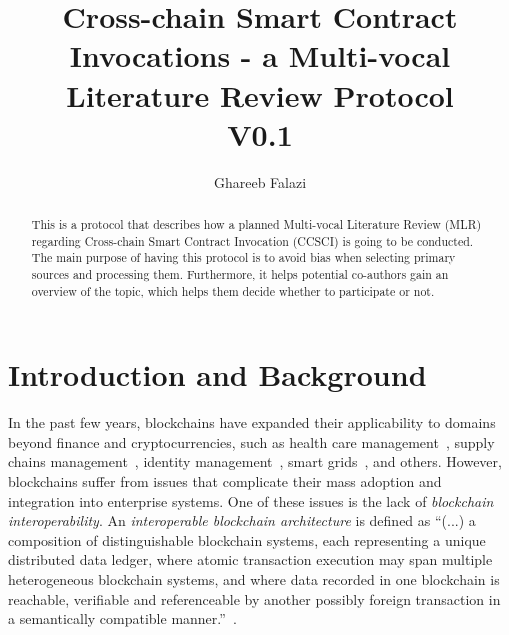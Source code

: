 \documentclass[review]{elsarticle}
\begin{document}
\begin{frontmatter}

\title{Cross-chain Smart Contract Invocations - a Multi-vocal Literature Review Protocol\\V0.1}
\author[iaas]{Ghareeb Falazi}
\address[iaas]{Universit\"atsstra\ss{}e 38, 70569 Stuttgart}


\begin{abstract}
This is a protocol that describes how a planned Multi-vocal Literature Review (MLR) regarding Cross-chain Smart Contract Invocation (CCSCI) is going to be conducted.
The main purpose of having this protocol is to avoid bias when selecting primary sources and processing them.
Furthermore, it helps potential co-authors gain an overview of the topic, which helps them decide whether to participate or not.
\end{abstract}


\end{frontmatter}

\tableofcontents

\linenumbers

\section{Introduction and Background}
\label{sec:introduction-and-background}
In the past few years, blockchains have expanded their applicability to domains beyond finance and cryptocurrencies, such as health care management~\cite{Tuli2020Healthcare}, supply chains management~\cite{Montecchi2019SupplyChains}, identity management~\cite{Zhu2018IdentityManagement}, smart grids~\cite{Pop2018SmartGrid}, and others.
However, blockchains suffer from issues that complicate their mass adoption and integration into enterprise systems.
One of these issues is the lack of \emph{blockchain interoperability}.
An \emph{interoperable blockchain architecture} is defined as \enquote{(...) a composition of distinguishable blockchain systems, each representing a unique distributed data ledger, where atomic transaction execution may span multiple heterogeneous blockchain systems, and where data recorded in one blockchain is reachable, verifiable and referenceable by another possibly foreign transaction in a semantically compatible manner.}~\cite{Hardjon2020Interoperability}.
\end{document}
